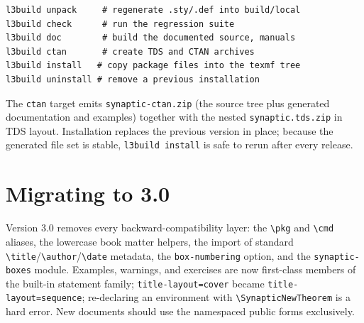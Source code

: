 \documentclass[a4paper,11pt]{scrartcl}
\begin{document}
\begin{verbatim}
l3build unpack     # regenerate .sty/.def into build/local
l3build check      # run the regression suite
l3build doc        # build the documented source, manuals
l3build ctan       # create TDS and CTAN archives
l3build install   # copy package files into the texmf tree
l3build uninstall # remove a previous installation
\end{verbatim}

The \texttt{ctan} target emits \texttt{synaptic-ctan.zip} (the source tree
plus generated documentation and examples) together with the nested
\texttt{synaptic.tds.zip} in TDS layout. Installation replaces the previous
version in place; because the generated file set is stable,
\texttt{l3build install} is safe to rerun after every release.

\section{Migrating to 3.0}

Version 3.0 removes every backward-compatibility layer: the \verb|\pkg| and
\verb|\cmd| aliases, the lowercase book matter helpers, the import of standard
\verb|\title|/\verb|\author|/\verb|\date| metadata, the \texttt{box-numbering}
option, and the \texttt{synaptic-boxes} module. Examples, warnings, and
exercises are now first-class members of the built-in statement family;
\texttt{title-layout=cover} became \texttt{title-layout=sequence}; re-declaring
an environment with \verb|\SynapticNewTheorem| is a hard error. New documents
should use the namespaced public forms exclusively.
\end{document}
